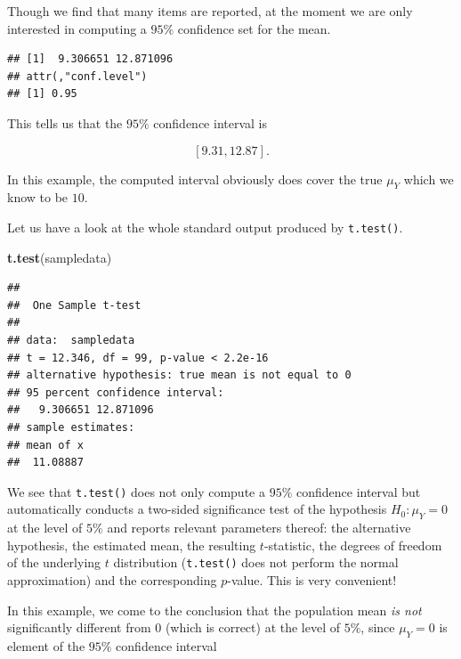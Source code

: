 \documentclass[]{book}
\newenvironment{Shaded}{\begin{snugshade}}{\end{snugshade}}
\newcommand{\KeywordTok}[1]{\textcolor[rgb]{0.13,0.29,0.53}{\textbf{#1}}}
\newcommand{\StringTok}[1]{\textcolor[rgb]{0.31,0.60,0.02}{#1}}
\newcommand{\OperatorTok}[1]{\textcolor[rgb]{0.81,0.36,0.00}{\textbf{#1}}}
\newcommand{\NormalTok}[1]{#1}
\theoremstyle{definition}
\theoremstyle{definition}
\theoremstyle{definition}
\theoremstyle{remark}
\begin{document}
Though we find that many items are reported, at the moment we are only
interested in computing a \(95\%\) confidence set for the mean.

\begin{Shaded}
\end{Shaded}

\begin{verbatim}
## [1]  9.306651 12.871096
## attr(,"conf.level")
## [1] 0.95
\end{verbatim}

This tells us that the \(95\%\) confidence interval is

\[ \left[9.31, 12.87\right]. \]

In this example, the computed interval obviously does cover the true
\(\mu_Y\) which we know to be \(10\).

Let us have a look at the whole standard output produced by
\texttt{t.test()}.

\begin{Shaded}
\begin{Highlighting}[]
\KeywordTok{t.test}\NormalTok{(sampledata)}
\end{Highlighting}
\end{Shaded}

\begin{verbatim}
## 
##  One Sample t-test
## 
## data:  sampledata
## t = 12.346, df = 99, p-value < 2.2e-16
## alternative hypothesis: true mean is not equal to 0
## 95 percent confidence interval:
##   9.306651 12.871096
## sample estimates:
## mean of x 
##  11.08887
\end{verbatim}

We see that \texttt{t.test()} does not only compute a \(95\%\)
confidence interval but automatically conducts a two-sided significance
test of the hypothesis \(H_0: \mu_Y = 0\) at the level of \(5\%\) and
reports relevant parameters thereof: the alternative hypothesis, the
estimated mean, the resulting \(t\)-statistic, the degrees of freedom of
the underlying \(t\) distribution (\texttt{t.test()} does not perform
the normal approximation) and the corresponding \(p\)-value. This is
very convenient!

In this example, we come to the conclusion that the population mean
\emph{is not} significantly different from \(0\) (which is correct) at
the level of \(5\%\), since \(\mu_Y = 0\) is element of the \(95\%\)
confidence interval
\end{document}
